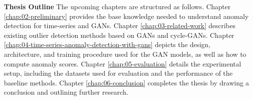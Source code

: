 \textbf{Thesis Outline} \-\hspace{0.15em} The upcoming chapters are structured as follows. Chapter \ref{chap:02-preliminary} provides the base knowledge needed to understand anomaly detection for time-series and GANs. Chapter \ref{chap:03-related-work} describes existing outlier detection methods based on GANs and cycle-GANs. Chapter \ref{chap:04-time-series-anomaly-detection-with-gans} depicts the design, architecture, and training procedure used for the GAN models, as well as how to compute anomaly scores. Chapter \ref{chap:05-evaluation} details the experimental setup, including the datasets used for evaluation and the performance of the baseline methods. Chapter \ref{chap:06-conclusion} completes the thesis by drawing a conclusion and outlining further research. 
